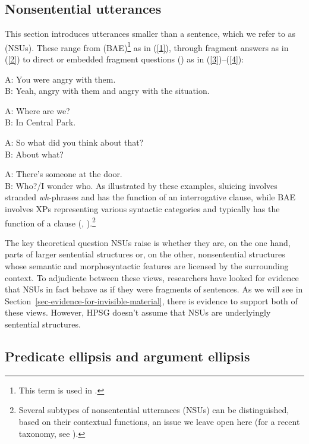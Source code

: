 \subsection{Nonsentential utterances}
This section introduces utterances smaller than a sentence, which we refer to as \emph{} (NSUs). These range from \emph{} (BAE)\footnote{This term is used in \citet{CJ2005a}.} as in (\ref{1}), through fragment answers as in (\ref{2})
to direct or embedded fragment questions () as in (\ref{3})--(\ref{4}):

\ea A: You were angry with them.\\ B: Yeah, angry with them and angry with the situation.\label{1}\z

\ea A: Where are we? \\B: In Central Park.\label{2}\z

\ea A: So what did you think about that?\\ B: About what? \label{3}\z

\ea A: There's someone at the door. \\B: Who?/I wonder who. \label{4}\z
%
As illustrated by these examples, sluicing involves stranded \emph{wh}-phrases and has the function of an interrogative clause, while BAE involves XPs representing various syntactic categories and typically has the function of a clause (\citealt[313]{Ginzburg:Sag:2000}, \citealt[233]{CJ2005a}).\footnote{Several subtypes of nonsentential utterances (NSUs) can be distinguished, based on their contextual functions, an issue we leave open here (for a recent taxonomy, see \citealt[217]{Ginzburg2012}).}

The key theoretical question NSUs raise is whether they are, on the one hand, parts of larger sentential structures or, on the other, nonsentential structures whose semantic and morphosyntactic features are licensed by the surrounding context. To adjudicate between these views, researchers have looked for evidence that NSUs in fact behave as if they were fragments of sentences. As we will see in Section~\ref{sec-evidence-for-invisible-material}, there is evidence to support both of these views. However, HPSG doesn't assume that NSUs are underlyingly sentential structures.

\subsection{Predicate ellipsis and argument ellipsis}
\label{ellipsis-sec-Predicate-ellipsis-and-argument-ellipsis}

